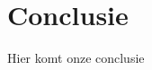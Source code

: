 \documentclass[Main.tex]{subfiles}
\begin{document}
\section{Conclusie}
Hier komt onze conclusie
\end{document}
